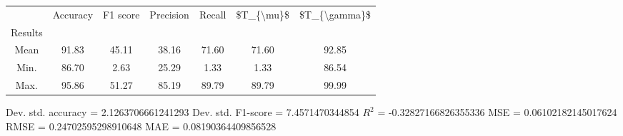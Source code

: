 \begin{tabular}{|c|c|c|c|c|c|c|}
\toprule
{} &  Accuracy &  F1 score &  Precision &  Recall &  \$T\_\{\textbackslash mu\}\$ &  \$T\_\{\textbackslash gamma\}\$ \\
Results &           &           &            &         &            &               \\
\hline
Mean    &     91.83 &     45.11 &      38.16 &   71.60 &      71.60 &         92.85 \\
Min.    &     86.70 &      2.63 &      25.29 &    1.33 &       1.33 &         86.54 \\
Max.    &     95.86 &     51.27 &      85.19 &   89.79 &      89.79 &         99.99 \\
\bottomrule
\end{tabular}

 Dev. std. accuracy = 2.1263706661241293
 Dev. std. F1-score = 7.4571470344854
 $R^2$ = -0.32827166826355336
 MSE = 0.06102182145017624
 RMSE = 0.24702595298910648
 MAE = 0.08190364409856528